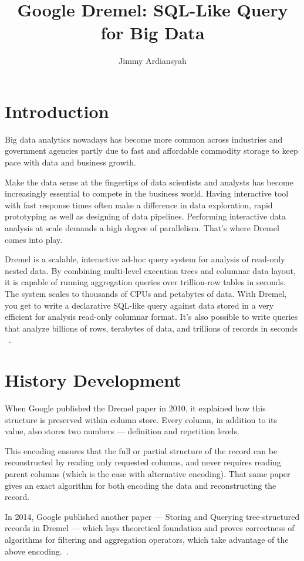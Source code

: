 \documentclass[9pt,twocolumn,twoside]{styles/osajnl}
\title{Google Dremel: SQL-Like Query for  Big Data}
\author[1,*]{Jimmy Ardiansyah}
\affil[1]{School of Informatics and Computing, Bloomington, IN 47408, U.S.A.}
\affil[*]{jardians@indiana.edu - S17-IR-2002}
\begin{document}
\maketitle



\section{Introduction}
Big data analytics nowadays has become more common across industries and government agencies partly due to fast and affordable commodity storage to keep pace with data and business growth.  

Make the data sense at the fingertips of data scientists and analysts has become increasingly essential to compete in the business world. Having interactive tool with fast response times often make a difference in data exploration, rapid prototyping as well as designing of data pipelines. Performing interactive data analysis at scale demands a high degree of parallelism. That's where Dremel comes into play.

Dremel is a scalable, interactive ad-hoc query system for analysis of read-only nested data. By combining multi-level execution trees and columnar data layout, it is capable of running aggregation queries over trillion-row tables in seconds.  The system scales to thousands of CPUs and petabytes of data.  With Dremel, you get to write a declarative SQL-like query against data stored in a very efficient for analysis read-only columnar format. It's also possible to write queries that analyze billions of rows, terabytes of data, and trillions of records in seconds ~\cite{paper-dremel}. 

\section{History Development}
When Google published the Dremel paper in 2010, it explained how this structure is preserved within column store. Every column, in addition to its value, also stores two numbers — definition and repetition levels.

This encoding ensures that the full or partial structure of the record can be reconstructed by reading only requested columns, and never requires reading parent columns (which is the case with alternative encoding). That same paper gives an exact algorithm for both encoding the data and reconstructing the record.

In 2014, Google published another paper — Storing and Querying tree-structured records in Dremel — which lays theoretical foundation and proves correctness of algorithms for filtering and aggregation operators, which take advantage of the above encoding.~\cite{www-dremel}.
\end{document}
